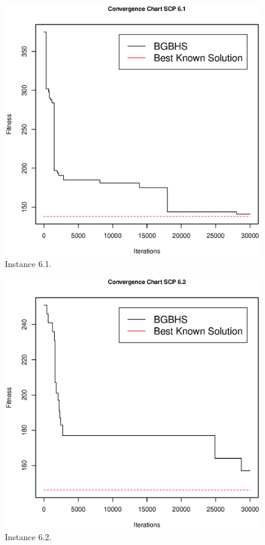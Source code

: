 \begin{figure}[]
\centering
\includegraphics[scale=.45]{Resultados/scp61.eps}
\caption{Instance 6.1.}
\label{fig:Instance.6.1}
\end{figure}

\begin{figure}[]
\centering
\includegraphics[scale=.45]{Resultados/scp62.eps}
\caption{Instance 6.2.}
\label{fig:Instance.6.2}
\end{figure}

